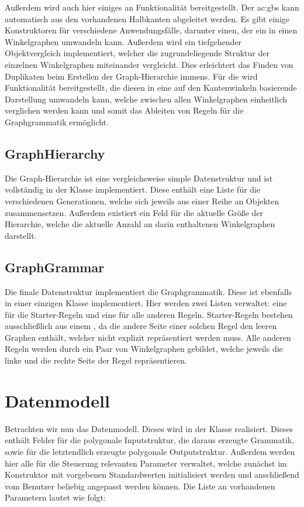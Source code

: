 Außerdem wird auch hier einiges an Funktionalität bereitgestellt. Der \gls{ac:gbs} kann automatisch aus den vorhandenen Halbkanten
abgeleitet werden. Es gibt einige Konstruktoren für verschiedene Anwendungsfälle, darunter einen, der ein  in
einen Winkelgraphen umwandeln kann. Außerdem wird ein tiefgehender Objektvergleich implementiert, welcher die zugrundeliegende Struktur
der einzelnen Winkelgraphen miteinander vergleicht. Dies erleichtert das Finden von Duplikaten beim Erstellen der
Graph-Hierarchie immens. Für die  wird Funktionalität bereitgestellt, die diesen in eine auf den
Kantenwinkeln basierende Darstellung umwandeln kann, welche zwischen allen Winkelgraphen einheitlich verglichen werden kann und somit
das Ableiten von Regeln für die Graphgrammatik ermöglicht.

\subsection{GraphHierarchy}
Die Graph-Hierarchie ist eine vergleichsweise simple Datenstruktur und ist vollständig in der Klasse  implementiert.
Diese enthält eine Liste für die verschiedenen Generationen, welche sich jeweils aus einer Reihe an  Objekten
zusammensetzen. Außerdem existiert ein Feld für die aktuelle Größe der Hierarchie, welche die aktuelle Anzahl an darin enthaltenen
Winkelgraphen darstellt.

\subsection{GraphGrammar}
Die finale Datenstruktur implementiert die Graphgrammatik. Diese ist ebenfalls in einer einzigen Klasse  implementiert.
Hier werden zwei Listen verwaltet: eine für die Starter-Regeln und eine für alle anderen Regeln. Starter-Regeln bestehen ausschließlich
aus einem , da die andere Seite einer solchen Regel den leeren Graphen enthält, welcher nicht explizit repräsentiert
werden muss. Alle anderen Regeln werden durch ein Paar von Winkelgraphen gebildet, welche jeweils die linke und die rechte Seite der
Regel repräsentieren.

\section{Datenmodell}
\label{chap:datenmodell}
Betrachten wir nun das Datenmodell. Dieses wird in der Klasse  realisiert. Dieses enthält Felder für die polygonale
Inputstruktur, die daraus erzeugte Grammatik, sowie für die letztendlich erzeugte polygonale Outputstruktur. Außerdem werden hier alle
für die Steuerung relevanten Parameter verwaltet, welche zunächst im Konstruktor mit vorgebenen Standardwerten initialisiert werden und
anschließend vom Benutzer beliebig angepasst werden können. Die Liste an vorhandenen Parametern lautet wie folgt:

